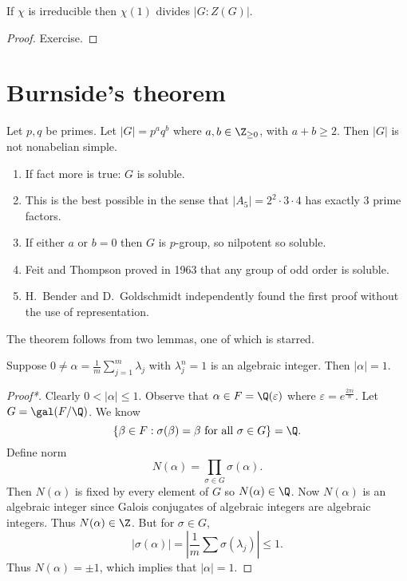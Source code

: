 \documentclass[a4paper]{article}
\theoremstyle{definition}
\begin{document}
\begin{theorem}
  If \(\chi\) is irreducible then \(\chi(1)\) divides \(|G:Z(G)|\).
\end{theorem}

\begin{proof}
  Exercise.
\end{proof}

\section{Burnside's theorem}

\begin{theorem}[Burnside]
  \label{thm:Burnside}
  Let \(p, q\) be primes. Let \(|G| = p^a q^b\) where \(a, b \in \Z_{\geq 0}\), with \(a + b \geq 2\). Then \(|G|\) is not nonabelian simple.
\end{theorem}

\begin{remark}\leavevmode
  \begin{enumerate}
  \item If fact more is true: \(G\) is soluble.
  \item This is the best possible in the sense that \(|A_5| = 2^2 \cdot 3 \cdot 4\) has exactly \(3\) prime factors.
  \item If either \(a\) or \(b = 0\) then \(G\) is \(p\)-group, so nilpotent so soluble.
  \item Feit and Thompson proved in 1963 that any group of odd order is soluble.
  \item H.\ Bender and D.\ Goldschmidt independently found the first proof without the use of representation.
  \end{enumerate}
\end{remark}

The theorem follows from two lemmas, one of which is starred.

\begin{lemma}
  Suppose \(0 \neq \alpha = \frac{1}{m} \sum_{j = 1}^m \lambda_j\) with \(\lambda_j^n = 1\) is an algebraic integer. Then \(|\alpha| = 1\).
\end{lemma}

\begin{proof}[Proof*]
  Clearly \(0 < |\alpha| \leq 1\). Observe that \(\alpha \in F = \Q(\varepsilon)\) where \(\varepsilon = e^{\frac{2\pi i}{n}}\). Let \(G = \gal(F/\Q)\). We know
  \[
    \{\beta \in F: \sigma(\beta) = \beta \text{ for all } \sigma \in G\} = \Q.
  \]
  Define norm
  \[
    N(\alpha) = \prod_{\sigma \in G} \sigma(\alpha).
  \]
  Then \(N(\alpha)\) is fixed by every element of \(G\) so \(N(\alpha) \in \Q\). Now \(N(\alpha)\) is an algebraic integer since Galois conjugates of algebraic integers are algebraic integers. Thus \(N(\alpha) \in \Z\). But for \(\sigma \in G\),
  \[
    |\sigma(\alpha)| = \left| \frac{1}{m} \sum \sigma(\lambda_j) \right| \leq 1.
  \]
  Thus \(N(\alpha) = \pm 1\), which implies that \(|\alpha| = 1\).
\end{proof}
\end{document}

